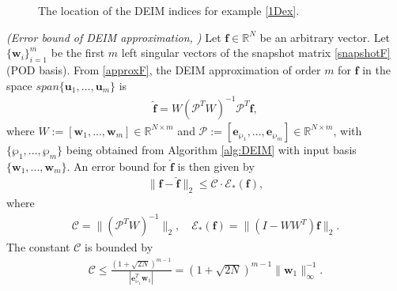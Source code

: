 \begin{figure}[H]
\centering
{}\hfill
{}
\caption{The location of the DEIM indices for example \eqref{1Dex}.}\label{DeimPoints}
\end{figure}
\begin{theorem}
\label{DEIMerrBound}
\emph{(Error bound of DEIM approximation, \cite{DEIM})}
\label{deimthm}
Let $\mathbf{f} \in \mathbb{R}^N$ be an arbitrary vector. Let $\{\mathbf{w}_i\}_{i=1}^m$ be the first $m$ left singular vectors of the snapshot matrix \eqref{snapshotF} (POD basis). From \eqref{approxF}, the DEIM approximation of order $m$ for $\mathbf{f}$ in the space $span \{\mathbf{u}_1,...,\mathbf{u}_m\}$ is
\begin{align*}
\mathbf{\hat f} = W(\mathcal{P}^T W)^{-1}\mathcal{P}^T \mathbf{f},
\end{align*}
where $W := [\mathbf{w}_1,...,\mathbf{w}_m] \in \mathbb{R}^{N \times m}$ and $\mathcal{P} := [\mathbf{e}_{\wp_1},...,\mathbf{e}_{\wp_m}] \in \mathbb{R}^{N \times m}$, with $\{\wp_1,...,\wp_m\}$ being obtained from Algorithm \ref{alg:DEIM} with input basis $\{\mathbf{w}_1,...,\mathbf{w}_m\}$. An error bound for $\mathbf{\hat f}$ is then given by
\begin{align*}
\|\mathbf{f} - \mathbf{\hat f}\|_2 \leq \mathcal{C} \cdot \mathcal{E}_*(\mathbf{f}),
\end{align*}
where
\begin{align*}
\mathcal{C} = \|(\mathcal{P}^T W)^{-1}\|_2, \quad \mathcal{E}_*(\mathbf{f}) = \|(I-W W^T)\mathbf{f}\|_2.
\end{align*}
The constant $\mathcal{C}$ is bounded by
\begin{align*}
\mathcal{C} \leq \frac{(1+\sqrt{2N})^{m-1}}{|\mathbf{e}^T_{\wp_1}\mathbf{w}_1|} = (1+\sqrt{2N})^{m-1} \|\mathbf{w}_1\|_\infty^{-1}.
\end{align*}
\end{theorem}
